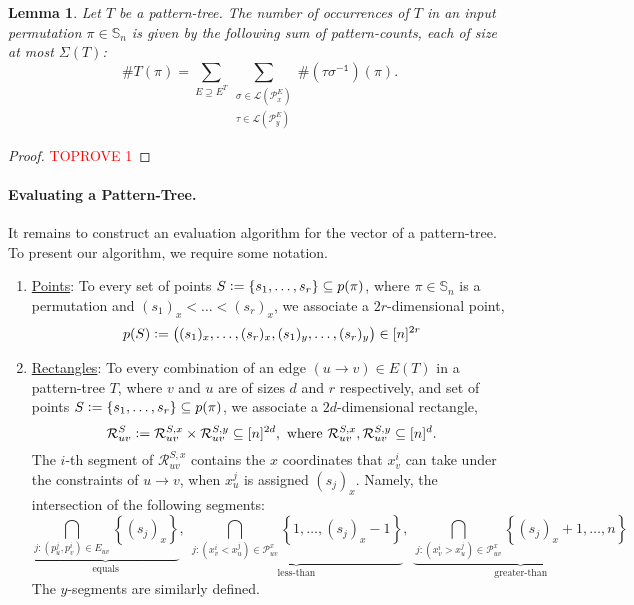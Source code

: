 \documentclass{article}
\newtheorem{lemma}[theorem]{Lemma}
\newcommand{\Sn}{\mathbb{S}_n}
\newcommand{\pc}[2]{{\# \mathtt{ #1 } \left( #2 \right)}}
\newcommand{\eqdef}{\vcentcolon=}
\theoremstyle{remark}
\theoremstyle{plain}
\begin{document}
\begin{lemma}
    \label{lem:pattern_tree_vec}
    Let $T$ be a pattern-tree.
    The number of occurrences of $T$ in an input permutation $\pi \in \Sn$ is given by the following sum of pattern-counts, each of size at most $\Sigma(T)$:
    \[
        \#T(\pi) = \sum_{ E \supseteq E^T } \sum_{ \substack{ \sigma \in \mathcal{L}(\mathcal{P}_x^{E}) \\ \tau \in \mathcal{L}(\mathcal{P}_y^{E}) } } \pc{\left(\tau \sigma^{-1}\right)}{\pi}.
    \]
\end{lemma}
\begin{proof}\textcolor{red}{TOPROVE 1}\end{proof}

\paragraph{Evaluating a Pattern-Tree.} It remains to construct an evaluation algorithm for the vector of a pattern-tree.
To present our algorithm, we require some notation.
\begin{enumerate}
    \item \underline{Points}: To every set of points $S \eqdef \{ s_1, \dots, s_r \} \subseteq p(\pi)$,
    where $\pi \in \Sn$ is a permutation and $(s_1)_x < \dots < (s_r)_x$,
    we associate a $2r$-dimensional point,
    \[
        p(S) \eqdef \big( (s_1)_x, \dots, (s_r)_x, (s_1)_y, \dots, (s_r)_y \big) \in [n]^{2r}
    \]

    \item \underline{Rectangles}: To every combination of an edge $(u \to v) \in E(T)$ in a pattern-tree $T$,
where $v$ and $u$ are of sizes $d$ and $r$ respectively,
and set of points $S \eqdef \{ s_1, \dots, s_r \} \subseteq p(\pi)$, 
we associate a $2d$-dimensional rectangle,
\[
    \mathcal{R}_{uv}^S \eqdef \mathcal{R}_{uv}^{S,x} \times \mathcal{R}_{uv}^{S,y} \subseteq [n]^{2d},
    \text{ where } \mathcal{R}_{uv}^{S,x}, \mathcal{R}_{uv}^{S,y} \subseteq [n]^d.
\]
The $i$-th segment of $\mathcal{R}_{uv}^{S,x}$ contains the $x$ coordinates that $x_v^i$ can take under the constraints of $u\to v$, when $x_u^j$ is assigned $(s_j)_x$. Namely, the intersection of the following segments:
\[
    \underbrace{\bigcap_{j : (p_u^j, p_v^i) \in E_{uv}} \left\{ (s_j)_x \right\}}_{\text{equals}},\; \underbrace{\bigcap_{j: (x_v^i < x_u^j) \in \mathcal{P}_{uv}^x } \left\{1, \dots, (s_j)_x - 1\right\}}_{\text{less-than}},\; \underbrace{\bigcap_{j: (x_v^i > x_u^j) \in \mathcal{P}_{uv}^x } \left\{ (s_j)_x+1, \dots, n \right\}}_{\text{greater-than}}
\]
The $y$-segments are similarly defined.    
\end{enumerate}
\end{document}
